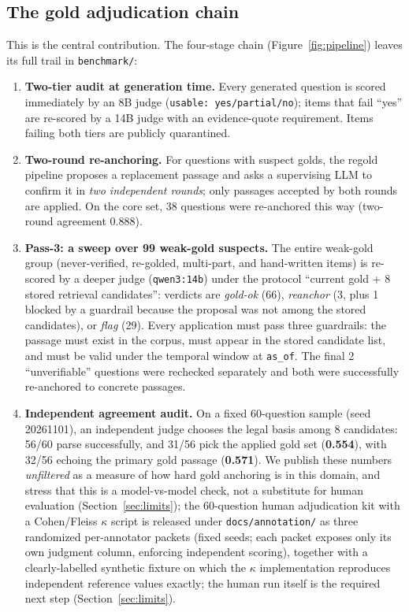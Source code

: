 \documentclass[10pt,a4paper,twocolumn]{article}
\newcommand{\code}[1]{\texttt{#1}}
\begin{document}
\subsection{The gold adjudication chain}

This is the central contribution. The four-stage chain (Figure~\ref{fig:pipeline}) leaves its full trail in \code{benchmark/}:

\begin{enumerate}
\item \textbf{Two-tier audit at generation time.} Every generated question is scored immediately by an 8B judge (\code{usable: yes/partial/no}); items that fail ``yes'' are re-scored by a 14B judge with an evidence-quote requirement. Items failing both tiers are publicly quarantined.
\item \textbf{Two-round re-anchoring.} For questions with suspect golds, the regold pipeline proposes a replacement passage and asks a supervising LLM to confirm it in \emph{two independent rounds}; only passages accepted by both rounds are applied. On the core set, 38 questions were re-anchored this way (two-round agreement 0.888).
\item \textbf{Pass-3: a sweep over 99 weak-gold suspects.} The entire weak-gold group (never-verified, re-golded, multi-part, and hand-written items) is re-scored by a deeper judge (\code{qwen3:14b}) under the protocol ``current gold + 8 stored retrieval candidates'': verdicts are \emph{gold-ok} (66), \emph{reanchor} (3, plus 1 blocked by a guardrail because the proposal was not among the stored candidates), or \emph{flag} (29). Every application must pass three guardrails: the passage must exist in the corpus, must appear in the stored candidate list, and must be valid under the temporal window at \code{as\_of}. The final 2 ``unverifiable'' questions were rechecked separately and both were successfully re-anchored to concrete passages.
\item \textbf{Independent agreement audit.} On a fixed 60-question sample (seed 20261101), an independent judge chooses the legal basis among 8 candidates: 56/60 parse successfully, and 31/56 pick the applied gold set (\textbf{0.554}), with 32/56 echoing the primary gold passage (\textbf{0.571}). We publish these numbers \emph{unfiltered} as a measure of how hard gold anchoring is in this domain, and stress that this is a model-vs-model check, not a substitute for human evaluation (Section~\ref{sec:limits}); the 60-question human adjudication kit with a Cohen/Fleiss $\kappa$ script is released under \code{docs/annotation/} as three randomized per-annotator packets (fixed seeds; each packet exposes only its own judgment column, enforcing independent scoring), together with a clearly-labelled synthetic fixture on which the $\kappa$ implementation reproduces independent reference values exactly; the human run itself is the required next step (Section~\ref{sec:limits}).
\end{enumerate}
\end{document}
